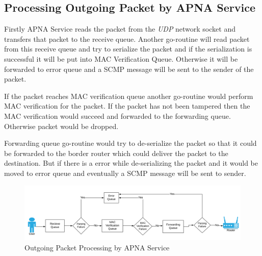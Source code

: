 \subsection{Processing Outgoing Packet by APNA Service} \label{apna_service:out}
Firstly APNA Service reads the packet from the \textit{UDP} network socket and transfers that packet to the receive queue. Another go-routine will read packet from this receive queue and try to serialize the packet and if the serialization is successful it will be put into MAC Verification Queue. Otherwise it will be forwarded to error queue and a SCMP message will be sent to the sender of the packet.

If the packet reaches MAC verification queue another go-routine would perform MAC verification for the packet. If the packet has not been tampered then the MAC verification would succeed and forwarded to the forwarding queue. Otherwise packet would be dropped.

Forwarding queue go-routine would try to de-serialize the packet so that it could be forwarded to the border router which could deliver the packet to the destination. But if there is a error while de-serializing the packet and it would be moved to error queue and eventually a SCMP message will be sent to sender.
\begin{figure}[th!!]
\centering
\hspace*{-2cm}\includegraphics[scale=0.3]{Figures/svc.png}
\decoRule
\caption[APNA Service Outgoing Packet]{Outgoing Packet Processing by APNA Service}
\label{fig:apna_svc_out}
\end{figure}

